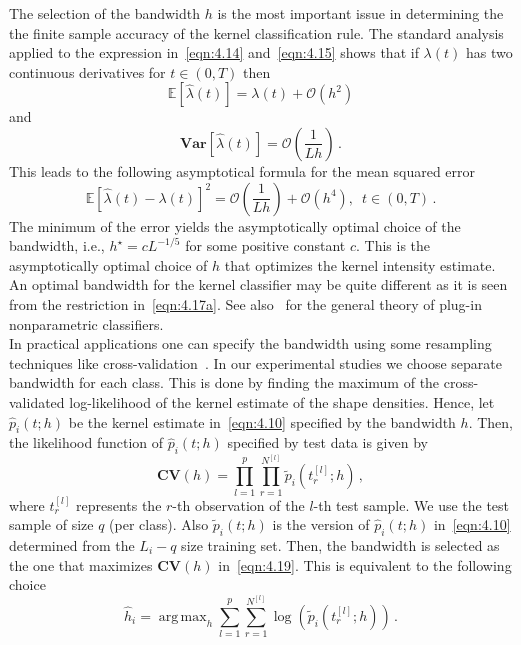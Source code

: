 \documentclass[lettersize,journal,onecolumn]{IEEEtran}
\theoremstyle{definition}
\newcommand{\E}[1]{\mathbb{E}\left[#1\right]}
\newcommand{\Var}[1]{\mathbf{Var}\left[#1\right]}
\DeclareMathOperator*{\argmax}{arg\,max}
\begin{document}
The selection of the bandwidth $h$ is the most important issue in determining the 
the finite sample accuracy of the kernel classification rule. The standard analysis
applied to the
expression in~\eqref{eqn:4.14} and~\eqref{eqn:4.15} shows that if $\lambda(t)$ has two 
continuous derivatives for $t\in(0,T)$ then
\begin{equation*}
	\E{\widehat{\lambda}(t)} = \lambda(t) + \mathcal{O}\left(h^{2}\right)
\end{equation*}
and
\begin{equation*}
	\Var{\widehat{\lambda}(t)} = \mathcal{O}\left(\frac{1}{Lh}\right)
	\,.
\end{equation*}
This leads to the following asymptotical formula for the mean squared error
\begin{equation*}
	\E{\widehat{\lambda}(t)-\lambda(t)}^{2} = 
	\mathcal{O}\left(\frac{1}{Lh}\right) + \mathcal{O}\left(h^{4}\right),
	\enspace t\in(0,T)
	\,.
\end{equation*}
The minimum of the error yields the asymptotically optimal choice of the bandwidth, i.e., 
$h^{\star}=cL^{-1/5}$ for some positive constant $c$. This is the asymptotically 
optimal choice of $h$ that optimizes the kernel intensity estimate. 
An optimal bandwidth for the kernel
classifier may be quite different as it is seen from the restriction
in~\eqref{eqn:4.17a}. See also~\cite{audibert2007fast}
for the general theory of plug-in nonparametric classifiers.\\
In practical applications one can specify the bandwidth using some resampling techniques
like cross-validation~\cite{diggle1988equivalence, wand1994kernel}. In our experimental
studies we choose separate bandwidth for each class. This is done by finding the 
maximum of the cross-validated log-likelihood of the kernel estimate of the shape 
densities. 
Hence, let $\widehat{p}_{i}(t;h)$ be the kernel estimate in~\eqref{eqn:4.10} specified 
by the bandwidth $h$. Then, the likelihood function of $\widehat{p}_{i}(t;h)$
specified by test data is given by
\begin{equation}
	\mathbf{CV}(h) = \prod_{l=1}^{p}\prod_{r=1}^{N^{[l]}}
	\widetilde{p}_{i}(t_{r}^{[l]};h)
	\label{eqn:4.19} \,,
\end{equation}
where $t_{r}^{[l]}$ represents the $r$-th observation of the $l$-th test sample.
We use the test sample of size $q$ (per class). Also $\widetilde{p}_{i}(t;h)$ is
the version of $\widehat{p}_{i}(t;h)$ in~\eqref{eqn:4.10} determined from
the $L_{i}-q$ size training set. Then, the bandwidth is selected as the one that
maximizes $\mathbf{CV}(h)$ in~\eqref{eqn:4.19}. This is equivalent to the following
choice
\begin{equation*}
	\widehat{h}_i =
	\argmax_h \sum_{l=1}^{p}\sum_{r=1}^{N^{[l]}} 
	\log \left(\widetilde{p}_{i}(t_{r}^{[l]};h)\right)
	\,.
\end{equation*}
\end{document}
